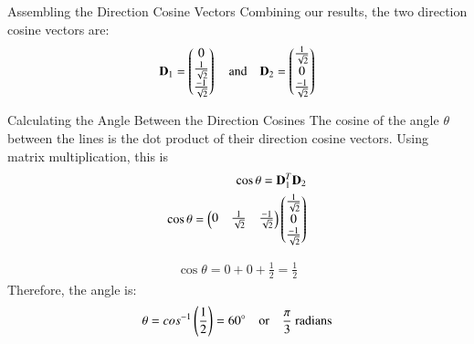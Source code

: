 \documentclass{beamer}
\begin{document}
\begin{frame}{Assembling the Direction Cosine Vectors}
    Combining our results, the two direction cosine vectors are:
\begin{align}    
\mathbf{D}_1 = \begin{pmatrix} 0 \\ \frac{1}{\sqrt{2}} \\ \frac{-1}{\sqrt{2}} \end{pmatrix} \quad \text{and} \quad \mathbf{D}_2 = \begin{pmatrix} \frac{1}{\sqrt{2}} \\ 0 \\ \frac{-1}{\sqrt{2}}\end{pmatrix}
\end{align}
\end{frame}

\begin{frame}{Calculating the Angle Between the Direction Cosines}
    The cosine of the angle $\theta$ between the lines is the dot product of their direction cosine vectors. Using matrix multiplication, this is 
\begin{align}
\cos \theta = \mathbf{D}_1^T \mathbf{D}_2\\ 
\cos \theta = \begin{pmatrix} 0 & \frac{1}{\sqrt{2}} & \frac{-1}{\sqrt{2}}\end{pmatrix} \begin{pmatrix} \frac{1}{\sqrt{2}} \\ 0 \\ \frac{-1}{\sqrt{2}} \end{pmatrix}
\end{align}


\begin{align}
\cos \theta = 0 + 0 + \frac{1}{2} = \frac{1}{2}
\end{align}
Therefore, the angle is:
\begin{align}
\theta = cos^{-1}\left(\frac{1}{2}\right) = 60^{\circ} \quad \text{or} \quad \frac{\pi}{3} \text{ radians}
\end{align}
\end{frame}
\end{document}
